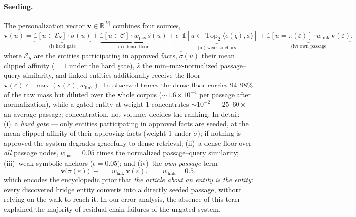 \documentclass[11pt,a4paper]{article}
\newcommand{\R}{\mathbb{R}}
\DeclareMathOperator*{\Top}{Top}
\begin{document}
\paragraph{Seeding.} The personalization vector $\mathbf v\in\R^{|V|}$
combines four sources,
\begin{equation}
\mathbf v(u)=
\underbrace{\mathbb 1[u\in\mathcal E_{S}]\cdot\overline{\tilde\sigma}(u)}_{\text{(i) hard gate}}
+\underbrace{\mathbb 1[u\in\mathcal C]\cdot w_{\text{pas}}\,\hat s(u)}_{\text{(ii) dense floor}}
+\underbrace{\epsilon\cdot\mathbb 1[u\in\Top_2\langle e(q),\phi\rangle]}_{\text{(iii) weak anchors}}
+\underbrace{\mathbb 1[u=\pi(\varepsilon)]\cdot w_{\text{link}}\,\mathbf v(\varepsilon)}_{\text{(iv) own passage}},
\label{eq:seeding}
\end{equation}
where $\mathcal E_S$ are the entities participating in approved facts,
$\overline{\tilde\sigma}(u)$ their mean clipped affinity ($=1$ under the hard
gate), $\hat s$ the min--max-normalized passage--query similarity, and
linked entities additionally receive the floor
$\mathbf v(\varepsilon)\leftarrow\max(\mathbf v(\varepsilon),w_{\text{link}})$.
In observed traces the dense floor carries $94$--$98\%$ of the raw mass but
diluted over the whole corpus (${\sim}1.6\times10^{-4}$ per passage after
normalization), while a gated entity at weight $1$ concentrates
${\sim}10^{-2}$ --- $25$--$60\times$ an average passage; concentration, not
volume, decides the ranking. In detail: (i)~a \emph{hard gate} --- only entities participating
in approved facts are seeded, at the mean clipped affinity of their approving
facts (weight $1$ under $\tilde\sigma$); if nothing is approved the system
degrades gracefully to dense retrieval; (ii)~a dense floor over \emph{all}
passage nodes, $w_{\text{pas}}\!=\!0.05$ times the normalized passage--query
similarity; (iii)~weak symbolic anchors ($\epsilon=0.05$); and (iv)~the
\emph{own-passage} term
\begin{equation}
\mathbf v\bigl(\pi(\varepsilon)\bigr)\;\mathrel{+}=\;
w_{\text{link}}\,\mathbf v(\varepsilon),\qquad w_{\text{link}}=0.5,
\label{eq:ownpassage}
\end{equation}
which encodes the encyclopedic prior that \emph{the article about an entity
is the entity}: every discovered bridge entity converts into a directly
seeded passage, without relying on the walk to reach it. In our error
analysis, the absence of this term explained the majority of residual chain
failures of the ungated system.
\end{document}
